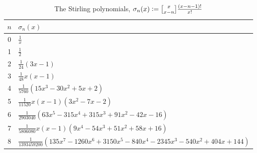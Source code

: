\documentclass[12pt,reqno]{article}
\numberwithin{sfootnote}{section}
\newcommand{\subtablewidth}{\textwidth}
\newcommand{\subtableskip}{\bigskip}
\newcommand{\tabletopstrut}[0]{\rule{0pt}{3ex}}
\numberwithin{equation}{section}
\theoremstyle{plain}
\theoremstyle{definition}
\theoremstyle{remark}
\newcommand{\defequals}{\ensuremath{\vcentcolon=}}
\newcommand{\gkpSI}[2]{\ensuremath{\genfrac{\lbrack}{\rbrack}{0pt}{}{#1}{#2}}}
\begin{document}
\begin{table}[h] 
\centering 

\smaller 

\begin{subtable}{\subtablewidth} 
\centering 

\begin{tabular}{|c|l|} \hline 
\hline\tabletopstrut 
$n$ & $\sigma_n(x)$ \\ \hline 
0 & $\frac{1}{x}$ \\ 
1 & $\frac{1}{2}$ \\ 
2 & $\frac{1}{24} (3 x-1)$ \\ 
3 & $\frac{1}{48} x (x-1)$ \\ 
4 & $\frac{1}{5760}\left(15 x^3-30 x^2+5 x+2\right)$ \\ 
5 & $\frac{1}{11520} x (x-1) \left(3 x^2-7 x-2\right)$ \\ 
6 & $\frac{1}{2903040}\left(63 x^5-315 x^4+315 x^3+91 x^2-42 x-16\right)$ \\ 
7 & $\frac{1}{5806080} x (x-1) \left(9 x^4-54 x^3+51 x^2+58 x+16\right)$ \\ 
8 & $\frac{1}{1393459200}\left( 
     135 x^7-1260 x^6+3150 x^5-840 x^4-2345 x^3-540 x^2+404 x+144\right)$ \\ 
    \hline\hline 
\end{tabular} 

\caption{The Stirling polynomials, 
                     $\sigma_n(x) \defequals \gkpSI{x}{x-n} \frac{(x-n-1)!}{x!}$} 

\subtableskip 


\end{subtable}
\end{table}
\end{document}
